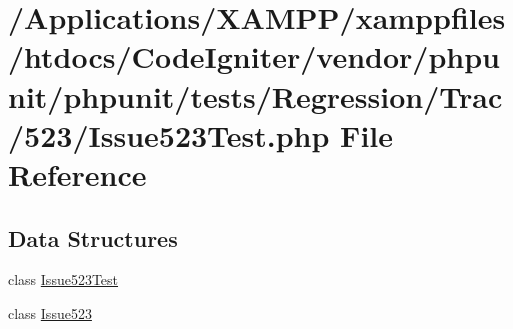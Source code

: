\hypertarget{_issue523_test_8php}{}\section{/\+Applications/\+X\+A\+M\+P\+P/xamppfiles/htdocs/\+Code\+Igniter/vendor/phpunit/phpunit/tests/\+Regression/\+Trac/523/\+Issue523\+Test.php File Reference}
\label{_issue523_test_8php}
\subsection*{Data Structures}
\begin{DoxyCompactItemize}
\item 
class \mbox{\hyperlink{class_issue523_test}{Issue523\+Test}}
\item 
class \mbox{\hyperlink{class_issue523}{Issue523}}
\end{DoxyCompactItemize}
